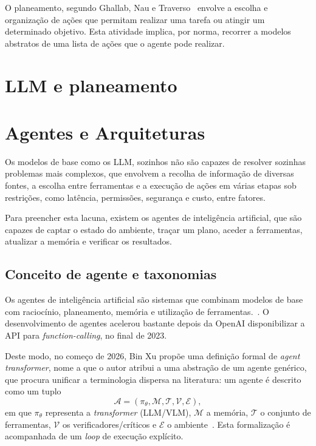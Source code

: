 O planeamento, segundo Ghallab, Nau e Traverso~\cite{Ghallab2025-da} envolve a escolha e organização de ações que permitam realizar uma tarefa ou atingir um determinado objetivo. Esta atividade implica, por norma, recorrer a modelos abstratos de uma lista de ações que o agente pode realizar.

\section{LLM e planeamento} %
\label{sec:llm_plan}

\section{Agentes e Arquiteturas}
\label{sec:agentes_arq}

Os modelos de base como os LLM, sozinhos não são capazes de resolver sozinhas problemas mais complexos, que envolvem a recolha de informação de diversas fontes, a escolha entre ferramentas e a execução de ações em várias etapas
sob restrições, como latência, permissões, segurança e custo, entre fatores.~\cite{xu2026ai}

Para preencher esta lacuna, existem os agentes de inteligência artificial, que são capazes de captar o estado do ambiente, traçar um plano, aceder a ferramentas, atualizar a memória e verificar os resultados.~\cite{xu2026ai}

\subsection{Conceito de agente e taxonomias}

Os agentes de inteligência artificial são sistemas que combinam modelos de base com raciocínio, planeamento, memória e utilização de ferramentas.~\cite{xu2026ai}. O desenvolvimento de agentes acelerou bastante depois da OpenAI disponibilizar a API para \textit{function-calling}, no final de 2023.~\cite{ibmEvolutionAgents}

Deste modo, no começo de 2026, Bin Xu propõe uma definição formal de \textit{agent transformer}, nome a que o autor atribui a uma abstração de um agente genérico, que procura unificar a terminologia dispersa na literatura: um agente é descrito como um tuplo
\begin{equation}
	\mathcal{A} = (\pi_{\theta}, \mathcal{M}, \mathcal{T}, \mathcal{V}, \mathcal{E}),
	\label{eq:agent_transformer}
\end{equation}
em que \(\pi_{\theta}\) representa a  \textit{transformer} (LLM/VLM), \(\mathcal{M}\) a memória, \(\mathcal{T}\) o conjunto de ferramentas, \(\mathcal{V}\) os verificadores/críticos e \(\mathcal{E}\) o ambiente~\cite{xu2026ai}. Esta formalização é acompanhada de um \textit{loop} de execução explícito. 


